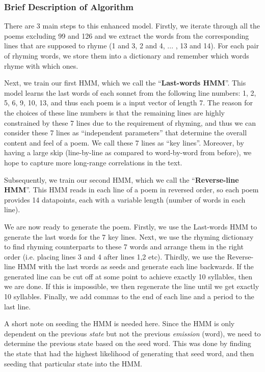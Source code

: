 \subsubsection*{Brief Description of Algorithm}
There are 3 main steps to this enhanced model. Firstly, we iterate through all the poems excluding 99 and 126 and we extract the words from the corresponding lines that are supposed to rhyme (1 and 3, 2 and 4, ... , 13 and 14). For each pair of rhyming words, we store them into a dictionary and remember which words rhyme with which ones.

Next, we train our first HMM, which we call the ``\textbf{Last-words HMM}''. This model learns the last words of each sonnet from the following line numbers: 1, 2, 5, 6, 9, 10, 13, and thus each poem is a input vector of length 7. The reason for the choices of these line numbers is that the remaining lines are highly constrained by these 7 lines due to the requirement of rhyming, and thus we can consider these 7 lines as ``independent parameters'' that determine the overall content and feel of a poem. We call these 7 lines as ``key lines''. Moreover, by having a large skip (line-by-line as compared to word-by-word from before), we hope to capture more long-range correlations in the text. 

Subsequently, we train our second HMM, which we call the ``\textbf{Reverse-line HMM}''. This HMM reads in each line of a poem in reversed order, so each poem provides 14 datapoints, each with a variable length (number of words in each line). 

We are now ready to generate the poem. Firstly, we use the Last-words HMM to generate the last words for the 7 key lines. Next, we use the rhyming dictionary to find rhyming counterparts to these 7 words and arrange them in the right order (i.e. placing lines 3 and 4 after lines 1,2 etc). Thirdly, we use the Reverse-line HMM with the last words as seeds and generate each line backwards. If the generated line can be cut off at some point to achieve exactly 10 syllables, then we are done. If this is impossible, we then regenerate the line until we get exactly 10 syllables. Finally, we add commas to the end of each line and a period to the last line.

A short note on seeding the HMM is needed here. Since the HMM is only dependent on the previous \textit{state} but not the previous \textit{emission} (word), we need to determine the previous state based on the seed word. This was done by finding the state that had the highest likelihood of generating that seed word, and then seeding that particular state into the HMM.

